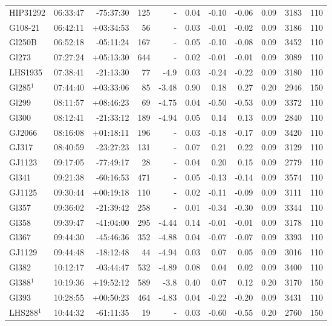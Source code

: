 \documentclass[referee]{aa}
\begin{document}
{\begin{longtable}{l r r r r r r r r r r}
HIP31292 & 06:33:47 & -75:37:30 & 125 &    - & 0.04 & -0.10 & -0.06 & 0.09 & 3183 &  110 \\
G108-21 & 06:42:11 & +03:34:53 & 56 &    - & 0.03 & -0.01 & -0.02 & 0.09 & 3186 &  110 \\
Gl250B & 06:52:18 & -05:11:24 & 167 &    - & 0.05 & -0.10 & -0.08 & 0.09 & 3452 &  110 \\
Gl273 & 07:27:24 & +05:13:30 & 644 &    - & 0.02 & -0.01 & -0.01 & 0.09 & 3089 &  110 \\
LHS1935 & 07:38:41 & -21:13:30 & 77 & -4.9 & 0.03 & -0.24 & -0.22 & 0.09 & 3180 &  110 \\
Gl285$^1$ & 07:44:40 & +03:33:06 & 85 & -3.48 & 0.90 & 0.18 & 0.27 & 0.20 & 2946 &  150 \\
Gl299 & 08:11:57 & +08:46:23 & 69 & -4.75 & 0.04 & -0.50 & -0.53 & 0.09 & 3372 &  110 \\
Gl300 & 08:12:41 & -21:33:12 & 189 & -4.94 & 0.05 & 0.14 & 0.13 & 0.09 & 2840 &  110 \\
GJ2066 & 08:16:08 & +01:18:11 & 196 &    - & 0.03 & -0.18 & -0.17 & 0.09 & 3420 &  110 \\
GJ317 & 08:40:59 & -23:27:23 & 131 &    - & 0.07 & 0.21 & 0.22 & 0.09 & 3129 &  110 \\
GJ1123 & 09:17:05 & -77:49:17 & 28 &    - & 0.04 & 0.20 & 0.15 & 0.09 & 2779 &  110 \\
Gl341 & 09:21:38 & -60:16:53 & 471 &    - & 0.05 & -0.13 & -0.14 & 0.09 & 3574 &  110 \\
GJ1125 & 09:30:44 & +00:19:18 & 110 &    - & 0.02 & -0.11 & -0.09 & 0.09 & 3111 &  110 \\
Gl357 & 09:36:02 & -21:39:42 & 258 &    - & 0.01 & -0.34 & -0.30 & 0.09 & 3344 &  110 \\
Gl358 & 09:39:47 & -41:04:00 & 295 & -4.44 & 0.14 & -0.01 & -0.01 & 0.09 & 3178 &  110 \\
Gl367 & 09:44:30 & -45:46:36 & 352 & -4.88 & 0.04 & -0.07 & -0.07 & 0.09 & 3393 &  110 \\
GJ1129 & 09:44:48 & -18:12:48 & 44 & -4.94 & 0.03 & 0.07 & 0.05 & 0.09 & 3016 &  110 \\
Gl382 & 10:12:17 & -03:44:47 & 532 & -4.89 & 0.08 & 0.04 & 0.02 & 0.09 & 3400 &  110 \\
Gl388$^1$ & 10:19:36 & +19:52:12 & 589 & -3.8 & 0.40 & 0.07 & 0.12 & 0.20 & 3170 &  150 \\
Gl393 & 10:28:55 & +00:50:23 & 464 & -4.83 & 0.04 & -0.22 & -0.20 & 0.09 & 3431 &  110 \\
LHS288$^1$ & 10:44:32 & -61:11:35 & 19 &    - & 0.03 & -0.60 & -0.55 & 0.20 & 2760 &  150 \\

\end{longtable}}
\end{document}
